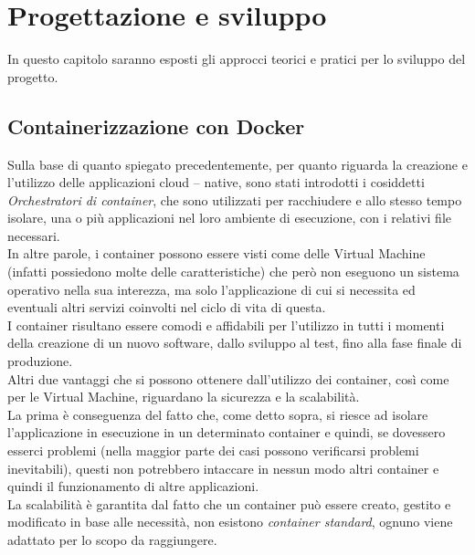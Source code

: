 \chapter{Progettazione e sviluppo}\label{chap:progettazionesviluppo}
In questo capitolo saranno esposti gli approcci teorici e pratici per lo sviluppo del progetto.

\section{Containerizzazione con Docker}\label{sec:ContDocker}
Sulla base di quanto spiegato precedentemente, per quanto riguarda la creazione e l'utilizzo delle applicazioni cloud – native, sono stati introdotti i cosiddetti 
\emph{Orchestratori di container}, che sono utilizzati per racchiudere e allo stesso tempo isolare, una o più applicazioni nel loro ambiente di esecuzione, con i relativi 
file necessari.\\
In altre parole, i container possono essere visti come delle Virtual Machine (infatti possiedono molte delle caratteristiche) che però non eseguono un sistema operativo 
nella sua interezza, ma solo l'applicazione di cui si necessita ed eventuali altri servizi coinvolti nel ciclo di vita di questa.\\
I container risultano essere comodi e affidabili per l'utilizzo in tutti i momenti della creazione di un nuovo software, dallo sviluppo al test, 
fino alla fase finale di produzione.\\
Altri due vantaggi che si possono ottenere dall'utilizzo dei container, così come per le Virtual Machine, riguardano la sicurezza e la scalabilità.\\
La prima è conseguenza del fatto che, come detto sopra, si riesce ad isolare l'applicazione in esecuzione in un determinato container e quindi, se dovessero 
esserci problemi (nella maggior parte dei casi possono verificarsi problemi inevitabili), questi non potrebbero intaccare in nessun modo altri container e 
quindi il funzionamento di altre applicazioni.\\
La scalabilità è garantita dal fatto che un container può essere creato, gestito e modificato in base alle necessità, non esistono \emph{container standard}, 
ognuno viene adattato per lo scopo da raggiungere.\\

